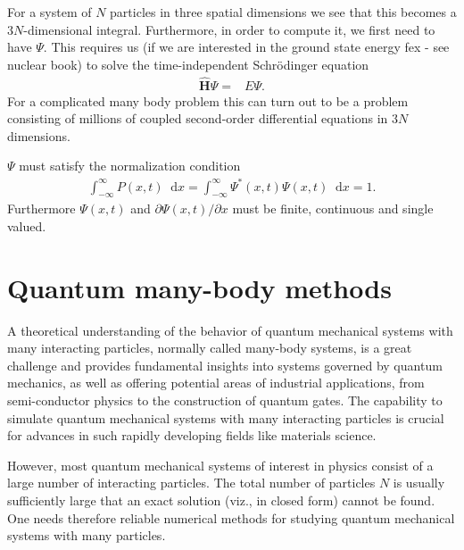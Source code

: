 \documentclass[twoside,english]{uiofysmaster}
\newcommand*\dif{\mathop{}\!\mathrm{d}}
\begin{document}
For a system of $N$ particles in three spatial dimensions we see that
this becomes a $3N$-dimensional integral. Furthermore, in order to
compute it, we first need to have $\Psi$. This requires us (if we are
interested in the ground state energy fex - see nuclear book) to solve
the time-independent Schrödinger equation
\begin{align}
	\hat{\bm{H}} \Psi =& E\Psi .
\end{align}
For a complicated many body problem this can turn out to be a problem
consisting of millions of coupled second-order differential equations
in $3N$ dimensions.

$\Psi$ must satisfy \cite{HjortJensen2015} the normalization condition
\begin{align}
	\int_{-\infty}^{\infty} P(x,t) \dif x = \int_{-\infty}^{\infty} \Psi^{\ast}(x,t) \Psi (x,t) \dif x = 1 .
\end{align}
Furthermore $\Psi (x,t)$ and $\partial \Psi(x,t) / \partial x$ must be finite, continuous and single valued.



\section{Quantum many-body methods}
A theoretical understanding of the behavior of quantum mechanical
systems with many interacting particles, normally called many-body
systems, is a great challenge and provides fundamental insights into
systems governed by quantum mechanics, as well as offering potential
areas of industrial applications, from semi-conductor physics to the
construction of quantum gates.  The capability to simulate quantum
mechanical systems with many interacting particles is crucial for
advances in such rapidly developing fields like materials science.

However, most quantum mechanical systems of interest in physics
consist of a large number of interacting particles.  The total number
of particles $N$ is usually sufficiently large that an exact solution
(viz., in closed form) cannot be found.  One needs therefore reliable
numerical methods for studying quantum mechanical systems with many
particles.
\end{document}
